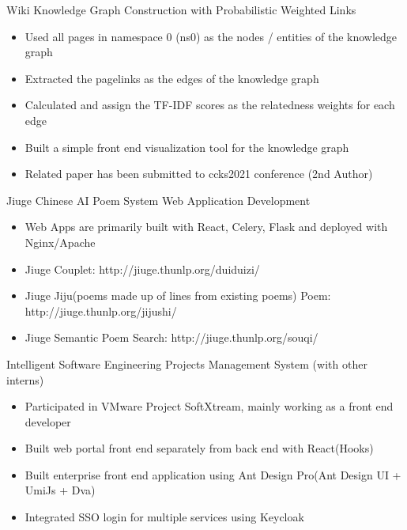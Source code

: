 \documentclass{resume}
\begin{document}
Wiki Knowledge Graph Construction with Probabilistic Weighted Links
\begin{itemize}
    \item Used all pages in namespace 0 (ns0) as the nodes / entities of the knowledge graph
    \item Extracted the pagelinks as the edges of the knowledge graph
    \item Calculated and assign the TF-IDF scores as the relatedness weights for each edge
    \item Built a simple front end visualization tool for the knowledge graph
    \item Related paper has been submitted to ccks2021 conference (2nd Author)
\end{itemize}

Jiuge Chinese AI Poem System Web Application Development
\begin{itemize}
    \item Web Apps are primarily built with React, Celery, Flask and deployed with Nginx/Apache
    \item Jiuge Couplet: http://jiuge.thunlp.org/duiduizi/
    \item Jiuge Jiju(poems made up of lines from existing poems) Poem: http://jiuge.thunlp.org/jijushi/
    \item Jiuge Semantic Poem Search: http://jiuge.thunlp.org/souqi/
\end{itemize}


Intelligent Software Engineering Projects Management System (with other interns)
\begin{itemize}
    \item Participated in VMware Project SoftXtream, mainly working as a front end developer
    \item Built web portal front end separately from back end with React(Hooks)
    \item Built enterprise front end application using Ant Design Pro(Ant Design UI + UmiJs + Dva)
    \item Integrated SSO login for multiple services using Keycloak
\end{itemize}

\end{document}
